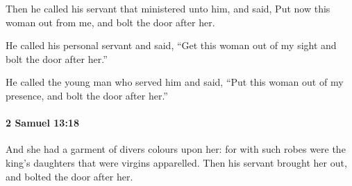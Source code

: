 			\begin{versebox}
					\item[BHS] 
					\item[ASV] Then he called his servant that ministered unto him, and said, Put now this woman out from me, and bolt the door after her.
					\item[NIV] He called his personal servant and said, “Get this woman out of my sight and bolt the door after her.”
					\item[NRSV] He called the young man who served him and said, “Put this woman out of my presence, and bolt the door after her.”
			\end{versebox}

		\paragraph{2 Samuel 13:18} %
			\label{2SAMUEL-13-18}

			And she had a garment of divers colours upon her: for with such robes were the king’s daughters that were virgins apparelled. Then his servant brought her out, and bolted the door after her.

